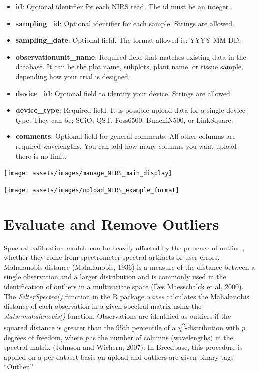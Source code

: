 \documentclass[
  12pt,
]{book}
\providecommand{\tightlist}{%
  \setlength{\itemsep}{0pt}\setlength{\parskip}{0pt}}
\begin{document}
\begin{itemize}
\tightlist
\item
  \textbf{id}: Optional identifier for each NIRS read. The id must be an integer.
\item
  \textbf{sampling\_id}: Optional identifier for each sample. Strings are allowed.
\item
  \textbf{sampling\_date}: Optional field. The format allowed is: YYYY-MM-DD.
\item
  \textbf{observationunit\_name}: Required field that matches existing data in the database. It can be the plot name, subplots, plant name, or tissue sample, depending how your trial is designed.
\item
  \textbf{device\_id}: Optional field to identify your device. Strings are allowed.
\item
  \textbf{device\_type}: Required field. It is possible upload data for a single device type. They can be: SCiO, QST, Foss6500, BunchiN500, or LinkSquare.
\item
  \textbf{comments}: Optional field for general comments. All other columns are required wavelengths. You can add how many columns you want upload -- there is no limit.
\end{itemize}

\begin{center}\texttt{[image: assets/images/manage\_NIRS\_main\_display]} \end{center}

\begin{center}\texttt{[image: assets/images/upload\_NIRS\_example\_format]} \end{center}

\hypertarget{evaluate-and-remove-outliers}{%
\section{Evaluate and Remove Outliers}\label{evaluate-and-remove-outliers}}

Spectral calibration models can be heavily affected by the presence of outliers, whether they come from spectrometer spectral artifacts or user errors. Mahalanobis distance (Mahalanobis, 1936) is a measure of the distance between a single observation and a larger distribution and is commonly used in the identification of outliers in a multivariate space (Des Maesschalck et al, 2000). The \emph{FilterSpectra()} function in the R package \href{https://CRAN.R-project.org/package=waves}{\emph{waves}} calculates the Mahalanobis distance of each observation in a given spectral matrix using the \emph{stats::mahalanobis()} function. Observations are identified as outliers if the squared distance is greater than the 95th percentile of a \(\chi\)\textsuperscript{2}-distribution with \emph{p} degrees of freedom, where \emph{p} is the number of columns (wavelengths) in the spectral matrix (Johnson and Wichern, 2007). In Breedbase, this procedure is applied on a per-dataset basis on upload and outliers are given binary tags ``Outlier.''
\end{document}
